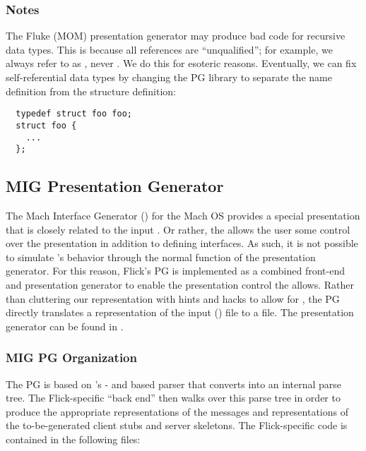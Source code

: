\subsubsection{Notes}


The Fluke (MOM) presentation generator may produce bad code for recursive data
types.  This is because all references are ``unqualified''; for example, we
always refer to  as , never .
We do this for esoteric reasons.  Eventually, we can fix self-referential data
types by changing the PG library to separate the name definition from the
structure definition:

\begin{verbatim}
  typedef struct foo foo;
  struct foo {
    ...
  };
\end{verbatim}


\subsection{MIG Presentation Generator}
\label{subsec:PG:MIG Presentation Generator}

The Mach Interface Generator (\MIG{}) for the Mach OS provides a special
presentation that is closely related to the input \IDL{}\@.  Or rather, the
\IDL{} allows the user some control over the presentation in addition to
defining interfaces.  As such, it is not possible to simulate \MIG{}'s behavior
through the normal function of the presentation generator.  For this reason,
Flick's \MIG{} PG is implemented as a combined front-end and presentation
generator to enable the presentation control the \MIG{} \IDL{} allows.  Rather
than cluttering our \AOI{} representation with hints and hacks to allow for
\MIG{}, the \MIG{} PG directly translates a representation of the input \IDL{}
() file to a \PRESC{} file.  The \MIG{} presentation generator
can be found in .

\subsubsection{MIG PG Organization}

The \MIG{} PG is based on \MIG{}'s - and  based
parser that converts \MIG{} \IDL{} into an internal parse tree.  The
Flick-specific ``back end'' then walks over this parse tree in order to produce
the appropriate \MINT{} representations of the messages and \PRESC{}
representations of the to-be-generated client stubs and server skeletons.  The
Flick-specific code is contained in the following files:

